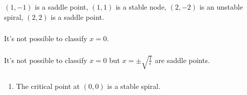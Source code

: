 \documentclass{article}
\begin{document}
$(1, -1)$ is a saddle point, $(1, 1)$ is a stable node, $(2, -2)$ is an unstable spiral, $(2,2)$ is a saddle point.

\setcounter{subsubsection}{22}
\subsubsection{}

It's not possible to classify $x = 0$.

\setcounter{subsubsection}{24}
\subsubsection{}

It's not possible to classify $x = 0$ but $x = \pm \sqrt{\frac{1}{\epsilon}}$ are saddle points.

\setcounter{subsubsection}{28}
\subsubsection{}

\begin{enumerate}
  \item The critical point at $(0, 0)$ is a stable spiral.
\end{enumerate}

\setcounter{subsubsection}{32}
\subsubsection{}
\end{document}
